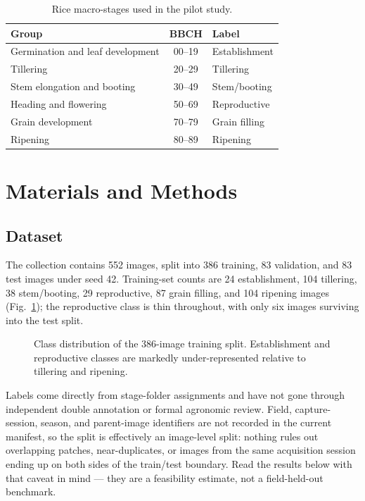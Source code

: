 \documentclass{llncs}
\begin{document}
\begin{table}[t]
\centering
\caption{Rice macro-stages used in the pilot study.}
\label{tab:stages}
\begin{tabular}{lcl}
\toprule
\textbf{Group} & \textbf{BBCH} & \textbf{Label} \\
\midrule
Germination and leaf development & 00--19 & Establishment \\
Tillering & 20--29 & Tillering \\
Stem elongation and booting & 30--49 & Stem/booting \\
Heading and flowering & 50--69 & Reproductive \\
Grain development & 70--79 & Grain filling \\
Ripening & 80--89 & Ripening \\
\bottomrule
\end{tabular}
\end{table}

\section{Materials and Methods}

\subsection{Dataset}

The collection contains 552 images, split into 386 training, 83 validation, and 83 test images under seed 42. Training-set counts are 24 establishment, 104 tillering, 38 stem/booting, 29 reproductive, 87 grain filling, and 104 ripening images (Fig.~\ref{fig:dist}); the reproductive class is thin throughout, with only six images surviving into the test split.

\begin{figure}[t]
\centering
\resizebox{0.72\textwidth}{!}{}
\caption{Class distribution of the 386-image training split. Establishment and reproductive classes are markedly under-represented relative to tillering and ripening.}
\label{fig:dist}
\end{figure}

Labels come directly from stage-folder assignments and have not gone through independent double annotation or formal agronomic review. Field, capture-session, season, and parent-image identifiers are not recorded in the current manifest, so the split is effectively an image-level split: nothing rules out overlapping patches, near-duplicates, or images from the same acquisition session ending up on both sides of the train/test boundary. Read the results below with that caveat in mind — they are a feasibility estimate, not a field-held-out benchmark.
\end{document}
